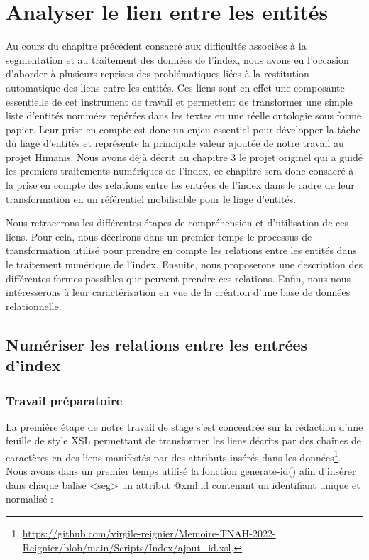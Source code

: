 \documentclass[a4paper,12pt,twoside]{book}
\begin{document}
	\chapter{Analyser le lien entre les entités}
	
	Au cours du chapitre précédent consacré aux difficultés associées à la segmentation et au traitement des données de l'index, nous avons eu l'occasion d'aborder à plusieurs reprises des problématiques liées à la restitution automatique des liens entre les entités. Ces liens sont en effet une composante essentielle de cet instrument de travail et permettent de transformer une simple liste d'entités nommées repérées dans les textes en une réelle ontologie sous forme papier. Leur prise en compte est donc un enjeu essentiel pour développer la tâche du liage d'entités et représente la principale valeur ajoutée de notre travail au projet Himanis. Nous avons déjà décrit au chapitre 3 le projet originel qui a guidé les premiers traitements numériques de l'index, ce chapitre sera donc consacré à la prise en compte des relations entre les entrées de l'index dans le cadre de leur transformation en un référentiel mobilisable pour le liage d'entités.
	
	Nous retracerons les différentes étapes de compréhension et d'utilisation de ces liens. Pour cela, nous décrirons dans un premier temps le processus de transformation utilisé pour prendre en compte les relations entre les entités dans le traitement numérique de l'index. Ensuite, nous proposerons une description des différentes formes possibles que peuvent prendre ces relations. Enfin, nous nous intéresserons à leur caractérisation en vue de la création d'une base de données relationnelle.
	
	\section{Numériser les relations entre les entrées d’index}
	
	\subsection{Travail préparatoire}
	
	La première étape de notre travail de stage s'est concentrée sur la rédaction d'une feuille de style XSL permettant de transformer les liens décrits par des chaînes de caractères en des liens manifestés par des attributs insérés dans les données\footnote{\url{https://github.com/virgile-reignier/Memoire-TNAH-2022-Reignier/blob/main/Scripts/Index/ajout_id.xsl}.}. Nous avons dans un premier temps utilisé la fonction \og generate-id()\fg{} afin d'insérer dans chaque balise <seg> un attribut @xml:id contenant un identifiant unique et normalisé :
	
\end{document}

